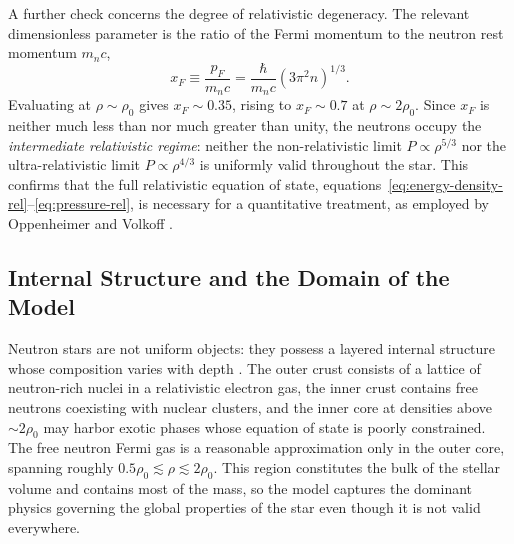 A further check concerns the degree of relativistic degeneracy. The
relevant dimensionless parameter is the ratio of the Fermi momentum to
the neutron rest momentum $m_n c$,
%
\begin{equation}
    x_F \equiv \frac{p_F}{m_n c}
             = \frac{\hbar}{m_n c}
               \left(3\pi^2 n\right)^{1/3}.
    \label{eq:relativistic-parameter}
\end{equation}
%
Evaluating at $\rho \sim \rho_0$ gives $x_F \sim 0.35$, rising to
$x_F \sim 0.7$ at $\rho \sim 2\rho_0$. Since $x_F$ is neither much
less than nor much greater than unity, the neutrons occupy the
\emph{intermediate relativistic regime}: neither the non-relativistic
limit $P \propto \rho^{5/3}$ nor the ultra-relativistic limit
$P \propto \rho^{4/3}$ is uniformly valid throughout the star. This
confirms that the full relativistic equation of state,
equations~\eqref{eq:energy-density-rel}--\eqref{eq:pressure-rel}, is
necessary for a quantitative treatment, as employed by Oppenheimer and
Volkoff \cite{Oppy}.
 
\subsection{Internal Structure and the Domain of the Model}
 
Neutron stars are not uniform objects: they possess a layered internal
structure whose composition varies with depth \cite{Chamel008}. The
outer crust consists of a lattice of neutron-rich nuclei in a
relativistic electron gas, the inner crust contains free neutrons
coexisting with nuclear clusters, and the inner core at densities above
$\sim 2\rho_0$ may harbor exotic phases whose equation of state is
poorly constrained. The free neutron Fermi gas is a reasonable
approximation only in the outer core, spanning roughly
$0.5\rho_0 \lesssim \rho \lesssim 2\rho_0$. This region constitutes the
bulk of the stellar volume and contains most of the mass, so the model
captures the dominant physics governing the global properties of the
star even though it is not valid everywhere.

